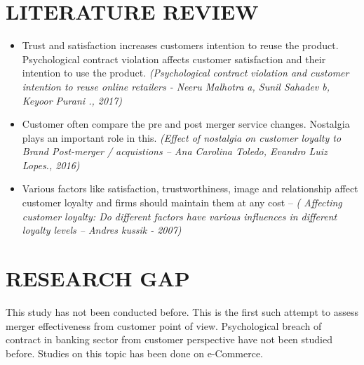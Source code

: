 \documentclass[12pt, a4paper]{article}
\begin{document}
\section*{LITERATURE REVIEW}
\begin{itemize}
\item Trust and satisfaction increases customers intention to reuse the product. Psychological contract violation affects customer satisfaction and their intention to use the product. \emph{(Psychological contract violation and customer intention to reuse online retailers - Neeru Malhotra a, Sunil Sahadev b, Keyoor Purani ., 2017)}
\item Customer often compare the pre and post merger service changes. Nostalgia plays an important role in this. \emph{(Effect of nostalgia on customer loyalty to Brand Post-merger / acquistions – Ana Carolina Toledo, Evandro Luiz Lopes., 2016)}
\item Various factors like satisfaction, trustworthiness, image and relationship affect customer loyalty and firms should maintain them at any cost – \emph{( Affecting customer loyalty: Do different factors have various influences in different loyalty levels – Andres kussik  - 2007)}
\end{itemize}
\section*{RESEARCH GAP}
This study has not been conducted before. This is the first such attempt to assess merger effectiveness from customer point of view. Psychological breach of contract in banking sector from customer perspective have not been studied before.  Studies on this topic has been done on e-Commerce.
\end{document}
